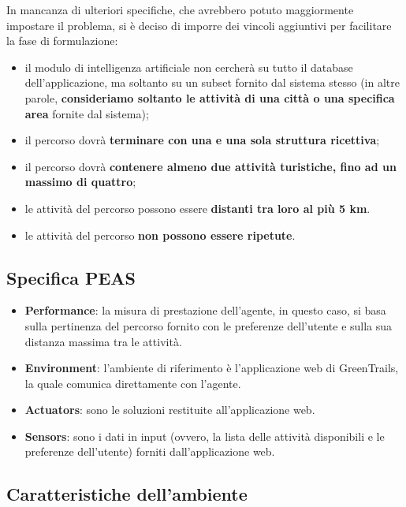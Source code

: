 \documentclass{CSUniSchoolLabReport}
\begin{document}
In mancanza di ulteriori specifiche, che avrebbero potuto maggiormente impostare il problema, si è deciso di imporre dei vincoli aggiuntivi per facilitare la fase di formulazione:
\begin{itemize}
	\item il modulo di intelligenza artificiale non cercherà su tutto il database dell'applicazione, ma soltanto su un subset fornito dal sistema stesso (in altre parole, \textbf{consideriamo soltanto le attività di una città o una specifica area} fornite dal sistema);
	\item il percorso dovrà \textbf{terminare con una e una sola struttura ricettiva};
	\item il percorso dovrà \textbf{contenere almeno due attività turistiche, fino ad un massimo di quattro};
	\item le attività del percorso possono essere \textbf{distanti tra loro al più 5 km}.
    \item le attività del percorso \textbf{non possono essere ripetute}.
\end{itemize}

\pagebreak

\subsection{Specifica PEAS}

\begin{itemize}
 \item \textbf{Performance}: la misura di prestazione dell'agente, in questo caso, si basa sulla pertinenza del percorso fornito con le preferenze dell'utente e sulla sua distanza massima tra le attività.
 \item \textbf{Environment}: l'ambiente di riferimento è l'applicazione web di GreenTrails, la quale comunica direttamente con l'agente.
 \item \textbf{Actuators}: sono le soluzioni restituite all'applicazione web.
 \item \textbf{Sensors}: sono i dati in input (ovvero, la lista delle attività disponibili e le preferenze dell'utente) forniti dall'applicazione web.
\end{itemize}


\subsection{Caratteristiche dell'ambiente}
\end{document}
